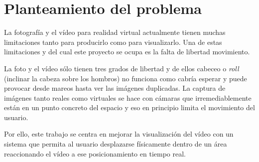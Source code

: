 
\pagestyle{empty}
\chapter {Planteamiento del problema}

La fotografía y el vídeo para realidad virtual actualmente tienen muchas limitaciones tanto para producirlo como para visualizarlo. Una de estas limitaciones y del cual este proyecto se ocupa es la falta de libertad movimiento. 

La foto y el vídeo sólo tienen tres grados de libertad y de ellos cabeceo o \textit{roll} (inclinar la cabeza sobre los hombros) no funciona como cabría esperar y puede provocar desde mareos hasta ver las imágenes duplicadas. La captura de imágenes tanto reales como virtuales se hace con cámaras que irremediablemente están en un punto concreto del espacio y eso en principio limita el movimiento del usuario.

Por ello, este trabajo se centra en mejorar la visualización del vídeo con un sistema que permita al usuario desplazarse físicamente dentro de un área reaccionando el vídeo a ese posicionamiento en tiempo real.